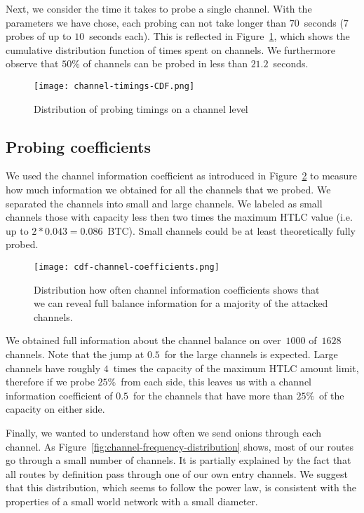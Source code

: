 Next, we consider the time it takes to probe a single channel.
With the parameters we have chose, each probing can not take longer than $70$~seconds ($7$ probes of up to $10$~seconds each).
This is reflected in Figure~\ref{fig:channel-timings-CDF}, which shows the cumulative distribution function of times spent on channels.
We furthermore observe that $50\%$ of channels can be probed in less than $21.2$~seconds.

\begin{figure}[]
	\centering
	\texttt{[image: channel-timings-CDF.png]}
	\caption{Distribution of probing timings on a channel level}
	\label{fig:channel-timings-CDF}
\end{figure}




\subsection{Probing coefficients}

We used the channel information coefficient as introduced in Figure~\ref{fig:cdf-channel-coefficients} to measure how much information we obtained for all the channels that we probed.
We separated the channels into small and large channels.
We labeled as small channels those with capacity less then two times the maximum HTLC value (i.e. up to $2*0.043=0.086$~BTC). Small channels could be at least theoretically fully probed.

\begin{figure}[]
	\centering
	\texttt{[image: cdf-channel-coefficients.png]}
	\caption{Distribution how often channel information coefficients shows that we can reveal full balance information for a majority of the attacked channels.}
	\label{fig:cdf-channel-coefficients}
\end{figure}

We obtained full information about the channel balance on over~$1000$ of~$1628$ channels.
Note that the jump at $0.5$~for the large channels is expected.
Large channels have roughly $4$~times the capacity of the maximum HTLC amount limit, therefore if we probe $25\%$~from each side, this leaves us with a channel information coefficient of $0.5$~for the channels that have more than $25\%$~of the capacity on either side.

Finally, we wanted to understand how often we send onions through each channel.
As Figure~\ref{fig:channel-frequency-distribution} shows, most of our routes go through a small number of channels.
It is partially explained by the fact that all routes by definition pass through one of our own entry channels.
We suggest that this distribution, which seems to follow the power law, is consistent with the properties of a small world network with a small diameter.

